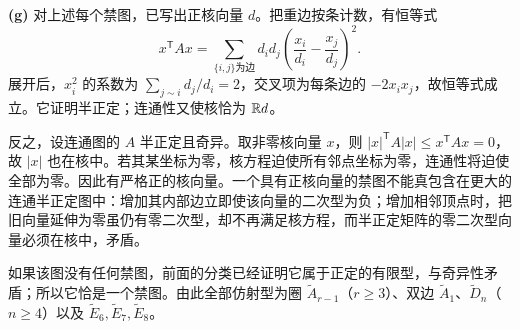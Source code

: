 \begin{solution}
\textbf{(g)} 对上述每个禁图，已写出正核向量 $d$。把重边按条计数，有恒等式
\[
 x^{\mathsf T}Ax=
 \sum_{\{i,j\}\text{为边}}d_i d_j
 \left(\frac{x_i}{d_i}-\frac{x_j}{d_j}\right)^2.
\]
展开后，$x_i^2$ 的系数为 $\sum_{j\sim i}d_j/d_i=2$，交叉项为每条边的 $-2x_ix_j$，故恒等式成立。它证明半正定；连通性又使核恰为 $\mathbb R d$。

反之，设连通图的 $A$ 半正定且奇异。取非零核向量 $x$，则
$|x|^{\mathsf T}A|x|\le x^{\mathsf T}Ax=0$，故 $|x|$ 也在核中。若其某坐标为零，核方程迫使所有邻点坐标为零，连通性将迫使全部为零。因此有严格正的核向量。一个具有正核向量的禁图不能真包含在更大的连通半正定图中：增加其内部边立即使该向量的二次型为负；增加相邻顶点时，把旧向量延伸为零虽仍有零二次型，却不再满足核方程，而半正定矩阵的零二次型向量必须在核中，矛盾。

如果该图没有任何禁图，前面的分类已经证明它属于正定的有限型，与奇异性矛盾；所以它恰是一个禁图。由此全部仿射型为圈 $\widetilde A_{r-1}$（$r\ge3$）、双边 $\widetilde A_1$、$\widetilde D_n$（$n\ge4$）以及 $\widetilde E_6,\widetilde E_7,\widetilde E_8$。
\end{solution}

